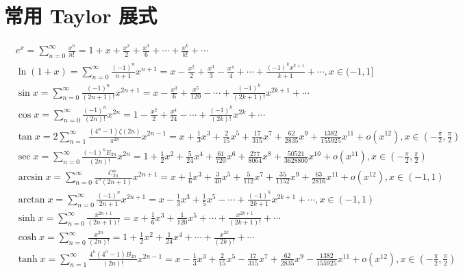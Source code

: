 \section{常用 Taylor 展式}
\[
\begin{aligned}
& e^x=\sum_{n=0}^{\infty} \frac{x^n}{n!}=1+x+\frac{x^2}{2}+\frac{x^3}{6}+\cdots+\frac{x^k}{k!}+\cdots \\
& \ln (1+x)=\sum_{n=0}^{\infty} \frac{(-1)^n}{n+1} x^{n+1}=x-\frac{x^2}{2}+\frac{x^3}{3}-\frac{x^4}{4}+\cdots+\frac{(-1)^k x^{k+1}}{k+1}+\cdots, x \in(-1,1] \\
& \sin x=\sum_{n=0}^{\infty} \frac{(-1)^n}{(2 n+1)!} x^{2 n+1}=x-\frac{x^3}{6}+\frac{x^5}{120}-\cdots+\frac{(-1)^k}{(2 k+1)!} x^{2 k+1}+\cdots \\
& \cos x=\sum_{n=0}^{\infty} \frac{(-1)^n}{(2 n)!} x^{2 n}=1-\frac{x^2}{2}+\frac{x^4}{24}-\cdots+\frac{(-1)^k}{(2 k)!} x^{2 k}+\cdots \\
& \tan x=2 \sum_{n=1}^{\infty} \frac{\left(4^n-1\right) \zeta(2 n)}{\pi^{2 n}} x^{2 n-1}=x+\frac{1}{3} x^3+\frac{2}{15} x^5+\frac{17}{315} x^7+\frac{62}{2835} x^9+\frac{1382}{155925} x^{11}+o\left(x^{12}\right), x \in\left(-\frac{\pi}{2}, \frac{\pi}{2}\right) \\
& \sec x=\sum_{n=0}^{\infty} \frac{(-1)^n E_{2 n}}{(2 n)!} x^{2 n}=1+\frac{1}{2} x^2+\frac{5}{24} x^4+\frac{61}{720} x^6+\frac{277}{8064} x^8+\frac{50521}{3628800} x^{10}+o\left(x^{11}\right), x \in\left(-\frac{\pi}{2}, \frac{\pi}{2}\right) \\
& \arcsin x=\sum_{n=0}^{\infty} \frac{C_{2 n}^n}{4^n(2 n+1)} x^{2 n+1}=x+\frac{1}{6} x^3+\frac{3}{40} x^5+\frac{5}{112} x^7+\frac{35}{1152} x^9+\frac{63}{2816} x^{11}+o\left(x^{12}\right), x \in(-1,1) \\
& \arctan x=\sum_{n=0}^{\infty} \frac{(-1)^n}{2 n+1} x^{2 n+1}=x-\frac{1}{3} x^3+\frac{1}{5} x^5-\cdots+\frac{(-1)^k}{2 k+1} x^{2 k+1}+\cdots, x \in(-1,1) \\
& \sinh x=\sum_{n=0}^{\infty} \frac{x^{2 n+1}}{(2 n+1)!}=x+\frac{1}{6} x^3+\frac{1}{120} x^5+\cdots+\frac{x^{2 k+1}}{(2 k+1)!}+\cdots \\
& \cosh x=\sum_{n=0}^{\infty} \frac{x^{2 n}}{(2 n)!}=1+\frac{1}{2} x^2+\frac{1}{24} x^4+\cdots+\frac{x^{2 k}}{(2 k)!}+\cdots \\
& \tanh x=\sum_{n=1}^{\infty} \frac{4^n\left(4^n-1\right) B_{2 n}}{(2 n)!} x^{2 n-1}=x-\frac{1}{3} x^3+\frac{2}{15} x^5-\frac{17}{315} x^7+\frac{62}{2835} x^9-\frac{1382}{155925} x^{11}+o\left(x^{12}\right), x \in\left(-\frac{\pi}{2}, \frac{\pi}{2}\right) \\

\end{aligned}\]
